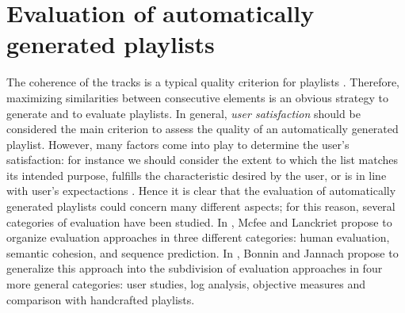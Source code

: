 \section{Evaluation of automatically generated playlists}
The coherence of the tracks is a typical quality criterion for playlists \cite{logan04}. Therefore, maximizing similarities between consecutive elements is an obvious strategy to generate and to evaluate playlists. In general, \textit{user satisfaction} should be considered the main criterion to assess the quality of an automatically generated playlist. However, many factors come into play to determine the user's satisfaction: for instance we should consider the extent to which the list matches its intended purpose, fulfills the characteristic desired by the user, or is in line with user's expectactions \cite{bonnin14} \cite{fields11}. Hence it is clear that the evaluation of automatically generated playlists could concern many different aspects; for this reason, several categories of evaluation have been studied. In \cite{mcfee11}, Mcfee and Lanckriet propose to organize evaluation approaches in three different categories: human evaluation, semantic cohesion, and sequence prediction. In \cite{bonnin14}, Bonnin and Jannach propose to generalize this approach into the subdivision of evaluation approaches in four more general categories: user studies, log analysis, objective measures and comparison with handcrafted playlists.
